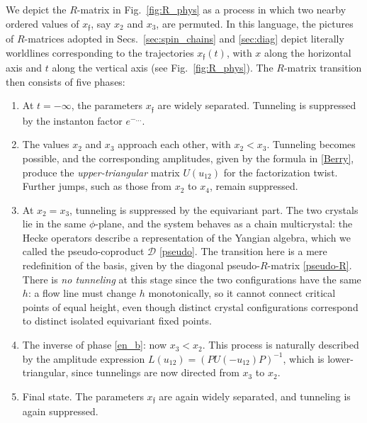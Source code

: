 \documentclass[10pt]{article}
\theoremstyle{definition}
\def\ff{\mathfrak{f}}
\def\sD{{\mathscr{D}}}
\numberwithin{equation}{section}
\begin{document}
We depict the $R$-matrix in Fig.~\ref{fig:R_phys} as a process in which two nearby ordered values of $x_{\ff}$, say $x_2$ and $x_3$, are permuted.
In this language, the pictures of $R$-matrices adopted in Secs.~\ref{sec:spin_chains} and \ref{sec:diag} depict literally worldlines corresponding to the trajectories $x_{\ff}(t)$, with $x$ along the horizontal axis and $t$ along the vertical axis (see Fig.~\ref{fig:R_phys}).
The $R$-matrix transition then consists of five phases:
\begin{enumerate}
	\item \label{en_a} At $t=-\infty$, the parameters $x_{\ff}$ are widely separated.
	Tunneling is suppressed by the instanton factor $e^{-\ldots}$.
	\item \label{en_b} The values $x_2$ and $x_3$ approach each other, with $x_2<x_3$.
	Tunneling becomes possible, and the corresponding amplitudes, given by the formula in \eqref{Berry}, produce the \emph{upper-triangular} matrix $U(u_{12})$ for the factorization twist.
	Further jumps, such as those from $x_2$ to $x_4$, remain suppressed.
	\item \label{en_c} At $x_2=x_3$, tunneling is suppressed by the equivariant part.
	The two crystals lie in the same $\phi$-plane, and the system behaves as a chain multicrystal: the Hecke operators describe a representation of the Yangian algebra, which we called the pseudo-coproduct $\sD$ \eqref{pseudo}.
	The transition here is a mere redefinition of the basis, given by the diagonal pseudo-$R$-matrix \eqref{pseudo-R}.
	There is \emph{no tunneling} at this stage since the two configurations have the same $h$: a flow line must change $h$ monotonically, so it cannot connect critical points of equal height, even though distinct crystal configurations correspond to distinct isolated equivariant fixed points.
	\item \label{en_d} The inverse of phase \ref{en_b}: now $x_3<x_2$.
	This process is naturally described by the amplitude expression $L(u_{12})=\left(PU(-u_{12})P\right)^{-1}$, which is lower-triangular, since tunnelings are now directed from $x_3$ to $x_2$.
	\item \label{en_e} Final state.
	The parameters $x_{\ff}$ are again widely separated, and tunneling is again suppressed.
\end{enumerate}
\end{document}
